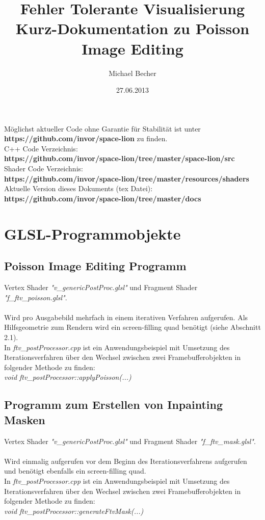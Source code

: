 \documentclass[10pt,a4paper,notitlepage]{article}
\title{\textbf{Fehler Tolerante Visualisierung}\\
Kurz-Dokumentation zu Poisson Image Editing}
\date{27.06.2013}
\author{Michael Becher}
\begin{document}
\maketitle
\begin{center}
Möglichst aktueller Code ohne Garantie für Stabilität ist unter \\
\textbf{https://github.com/invor/space-lion} zu finden.\\ \vspace{0.25cm}
C++ Code Verzeichnis:\\ \textbf{https://github.com/invor/space-lion/tree/master/space-lion/src}\\
Shader Code Verzeichnis:\\ \textbf{https://github.com/invor/space-lion/tree/master/resources/shaders}\\ \vspace{0.25cm}
Aktuelle Version dieses Dokuments (tex Datei):
\textbf{https://github.com/invor/space-lion/tree/master/docs}
\end{center}
\section{GLSL-Programmobjekte}
\subsection{Poisson Image Editing Programm}
Vertex Shader \textit{"v\_genericPostProc.glsl"} und Fragment Shader \textit{"f\_ftv\_poisson.glsl"}.\\ \\
Wird pro Ausgabebild mehrfach in einem iterativen Verfahren aufgerufen. Als Hilfsgeometrie zum Rendern wird ein screen-filling quad benötigt (siehe Abschnitt 2.1).\\
In \textit{ftv\_postProcessor.cpp} ist ein Anwendungsbeispiel mit Umsetzung des Iterationsverfahren über den Wechsel zwischen zwei Framebufferobjekten in folgender Methode zu finden:\\
\textit{void ftv\_postProcessor::applyPoisson(...)}
\subsection{Programm zum Erstellen von Inpainting Masken}
Vertex Shader \textit{"v\_genericPostProc.glsl"} und Fragment Shader \textit{"f\_ftv\_mask.glsl"}.\\ \\
Wird einmalig aufgerufen vor dem Beginn des Iterationsverfahrens aufgerufen und benötigt ebenfalls ein screen-filling quad.\\
In \textit{ftv\_postProcessor.cpp} ist ein Anwendungsbeispiel mit Umsetzung des Iterationsverfahren über den Wechsel zwischen zwei Framebufferobjekten in folgender Methode zu finden:\\
\textit{void ftv\_postProcessor::generateFtvMask(...)}
\end{document}
